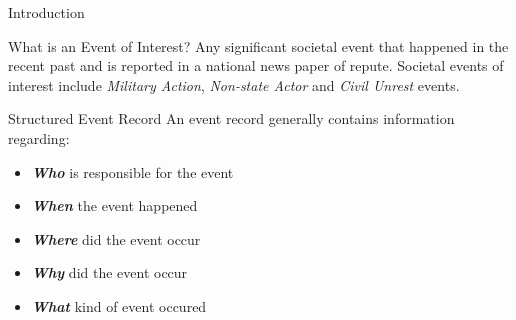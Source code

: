 \begin{frame}{Introduction}
\begin{block}{What is an Event of Interest?}
 Any significant societal event  that happened in the recent past and is reported in a national news paper of repute. Societal events of interest include \textit{Military Action}, \textit{Non-state Actor} and \textit{Civil Unrest} events. 
\end{block}
\pause
\begin{block}{Structured Event Record}
An event record generally contains information regarding: 
\begin{itemize}
    \item \textbf{\textit{Who}} is responsible for the event
    \item \textbf{\textit{When}} the event happened
    \item \textbf{\textit{Where}} did the event occur
    \item \textbf{\textit{Why}} did the event occur
    \item \textbf{\textit{What}} kind of event occured
\end{itemize}
\end{block}
\end{frame}

